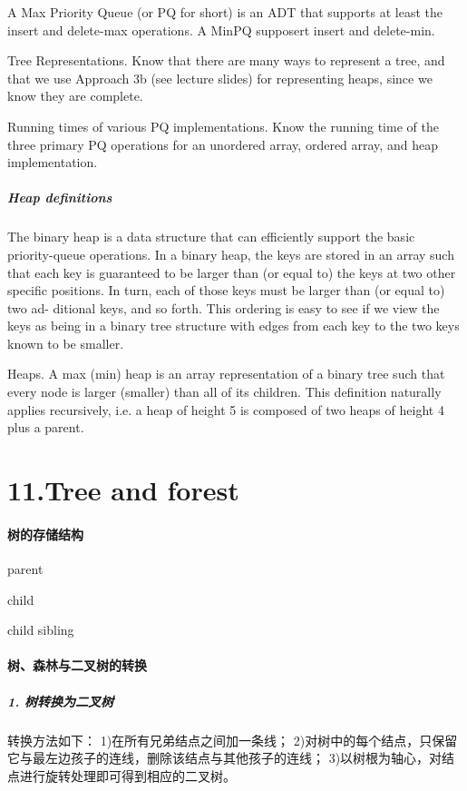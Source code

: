 \documentclass[UTF8]{ctexart}
\begin{document}
A Max Priority Queue (or PQ for short) is an ADT that supports at least the insert and delete-max operations. A MinPQ supposert insert and delete-min.

Tree Representations. Know that there are many ways to represent a tree, and that we use Approach 3b (see lecture slides) for representing heaps, since we know they are complete.

Running times of various PQ implementations. Know the running time of the three primary PQ operations for an unordered array, ordered array, and heap implementation.

\subparagraph{Heap definitions}

The binary heap is a data structure that can efficiently support the basic priority-queue operations. 
In a binary heap, the keys are stored in an array such that each key is guaranteed to be larger than 
(or equal to) the keys at two other specific positions. 
In turn, each of those keys must be larger than (or equal to) two ad- ditional keys, and so forth. 
This ordering is easy to see if we view the keys as being in a binary tree structure 
with edges from each key to the two keys known to be smaller.

Heaps. A max (min) heap is an array representation of a binary tree such that every node is larger (smaller) than all of its children. This definition naturally applies recursively, i.e. a heap of height 5 is composed of two heaps of height 4 plus a parent.




\newpage
\section*{11.Tree and forest}
\paragraph{树的存储结构}

parent 

child 

child sibling



\paragraph{树、森林与二叉树的转换}

\subparagraph{1. 树转换为二叉树}
转换方法如下：
	1)在所有兄弟结点之间加一条线；
	2)对树中的每个结点，只保留它与最左边孩子的连线，删除该结点与其他孩子的连线；
	3)以树根为轴心，对结点进行旋转处理即可得到相应的二叉树。
\end{document}
